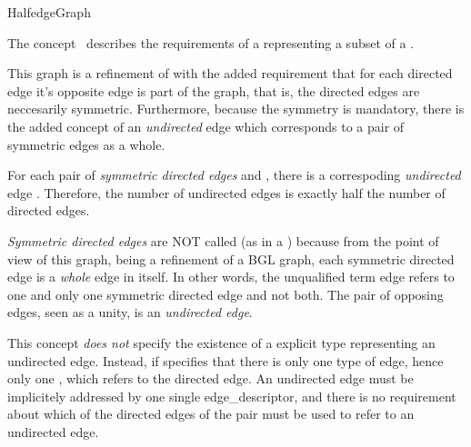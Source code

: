 
\begin{ccRefConcept}{HalfedgeGraph}


\ccDefinition

The concept \ccRefName\ describes the requirements of a
representing a subset of a .

This graph is a refinement of  with the added requirement that for each directed edge  it's opposite edge  is part of the graph, that is, the directed edges are neccesarily symmetric. Furthermore, because the symmetry is mandatory, there is the added concept of an {\em undirected} edge which corresponds to a pair of symmetric edges as a whole.

For each pair of {\em symmetric directed edges}  and , there is a correspoding {\em undirected} edge . Therefore, the number of undirected edges is exactly half the number of directed edges.

{\em Symmetric directed edges} are NOT called  (as in a ) because from the point of view of this graph, being a refinement of a BGL graph, each symmetric directed edge is a {\em whole} edge in itself. In other words, the unqualified term edge refers to one and only one symmetric directed edge and not both. The pair of opposing edges, seen as a unity, is an {\em undirected edge}.
 
This concept {\em does not} specify the existence of a explicit type representing 
an undirected edge. Instead, if specifies that there is only one type of edge,
hence only one , which refers to the directed edge.
An undirected edge must be implicitely addressed by one single edge\_descriptor,
and there is no requirement about which of the directed edges of the pair must
be used to refer to an undirected edge.


\end{ccRefConcept}
